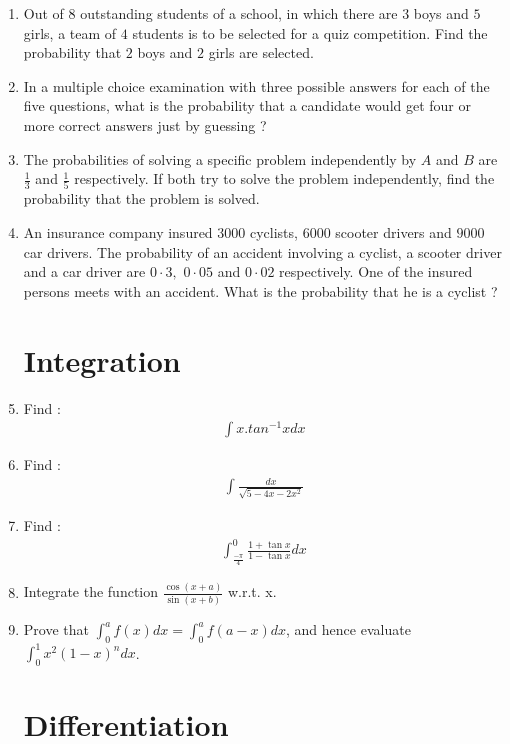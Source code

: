 \documentclass[10pt,-letter paper]{article}
\providecommand{\brak}[1]{\ensuremath{\left(#1\right)}}
\begin{document}
\begin{enumerate}
\item Out of $8$ outstanding students of a school, in which there are $3$ boys and $5$ girls, a team of $4$ students is to be selected for a quiz competition. Find the probability that $2$ boys and $2$ girls are selected.
\item In a multiple choice examination with three possible answers for each of the five questions, what is the probability that a candidate would get four or more correct answers just by guessing ?
\item The probabilities of solving a specific problem independently by $A$ and $B$ are $\frac{1}{3}$ and $\frac{1}{5}$ respectively. If both try to solve the problem independently, find the probability that the problem is solved.
\item An insurance company insured $3000$ cyclists, $6000$ scooter drivers and $9000$ car drivers. The probability of an accident involving a cyclist, a scooter driver and a car driver are $0\cdot3,$ $0\cdot05$ and $0\cdot02$ respectively. One of the insured persons meets with an accident. What is the probability that he is a cyclist ?

\section{Integration}

\item Find :
	\begin{align*}
		\int x.tan^{-1}x dx
	\end{align*}
\item Find :
	\begin{align*}
		\int {\frac{dx}{\sqrt{5 -4 x - 2 x^{2}}}}
	\end{align*}
\item Find :
	\begin{align*}
		\int_{\frac{-\pi}{4}}^{0}\frac{1+\tan x}{1-\tan x} dx
	\end{align*}
\item Integrate the function $\frac{\cos\brak{x + a}}{\sin\brak{x + b}}$ w.r.t. x.
\item Prove that $\int_{0}^{a} f \brak {x}d x = \int_{0}^{a} f\brak{a-x} d x$, and hence evaluate  $\int_{0}^{1} x^{2}\brak{1-x}^{n}dx$.

\section{Differentiation}


\end{enumerate}
\end{document}
